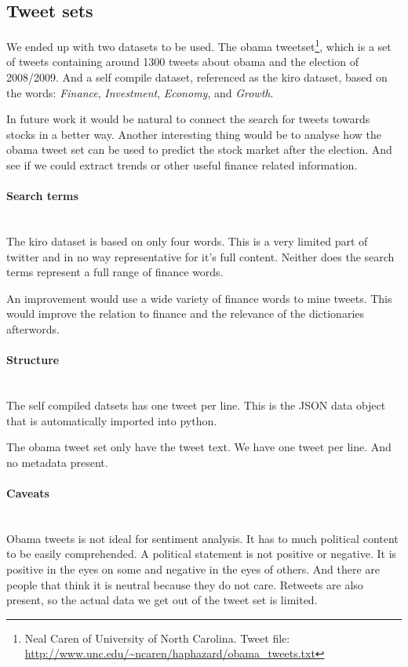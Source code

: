 \subsection{Tweet sets}
We ended up with two datasets to be used. The obama tweetset\footnote{Neal
Caren of University of North Carolina. Tweet file:
\url{http://www.unc.edu/~ncaren/haphazard/obama_tweets.txt}}, which is a set of
tweets containing around 1300 tweets about obama and the election of 2008/2009.
And a self compile dataset, referenced as the kiro dataset, based on the words:
\textit{Finance}, \textit{Investment}, \textit{Economy}, and \textit{Growth}. 

In future work it would be natural to connect the search for tweets towards
stocks in a better way. Another interesting thing would be to analyse how the
obama tweet set can be used to predict the stock market after the election. And
see if we could extract trends or other useful finance related information.  

\paragraph{Search terms}
\hspace{0pt}\\
The kiro dataset is based on only four words. This is a very limited part of
twitter and in no way representative for it's full content. Neither does the
search terms represent a full range of finance words.

An improvement would use a wide variety of finance words to mine tweets. This
would improve the relation to finance and the relevance of the dictionaries
afterwords. 

\paragraph{Structure}
\hspace{0pt}\\
The self compiled datsets has one tweet per line. This is the JSON data object
that is automatically imported into python. 

The obama tweet set only have the tweet text. We have one tweet per line. And
no metadata present. 

\paragraph{Caveats}
\hspace{0pt}\\
Obama tweets is not ideal for sentiment analysis. It has to much political
content to be easily comprehended. A political statement is not positive or
negative. It is positive in the eyes on some and negative in the eyes of others.
And there are people that think it is neutral because they do not care. Retweets
are also present, so the actual data we get out of the tweet set is limited. 

